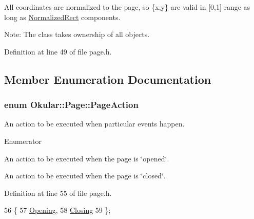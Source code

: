 All coordinates are normalized to the page, so \{x,y\} are valid in \mbox{[}0,1\mbox{]} range as long as \hyperlink{classOkular_1_1NormalizedRect}{Normalized\+Rect} components.

Note\+: The class takes ownership of all objects. 

Definition at line 49 of file page.\+h.



\subsection{Member Enumeration Documentation}
\hypertarget{classOkular_1_1Page_a6a8e241cdb604d5c90d5f80b169788f7}{
\subsubsection[{Page\+Action}]{\setlength{\rightskip}{0pt plus 5cm}enum {\bf Okular\+::\+Page\+::\+Page\+Action}}}\label{classOkular_1_1Page_a6a8e241cdb604d5c90d5f80b169788f7}
An action to be executed when particular events happen. \begin{Desc}
\item[Enumerator]\par
\begin{description}
\item[{\em 
\hypertarget{classOkular_1_1Page_a6a8e241cdb604d5c90d5f80b169788f7adbcb6b79c0b2118ed23a0d1c89391f87}{Opening}\label{classOkular_1_1Page_a6a8e241cdb604d5c90d5f80b169788f7adbcb6b79c0b2118ed23a0d1c89391f87}
}]An action to be executed when the page is \char`\"{}opened\char`\"{}. \item[{\em 
\hypertarget{classOkular_1_1Page_a6a8e241cdb604d5c90d5f80b169788f7ae9b42d3ddb97cc7f889104c73c686f80}{Closing}\label{classOkular_1_1Page_a6a8e241cdb604d5c90d5f80b169788f7ae9b42d3ddb97cc7f889104c73c686f80}
}]An action to be executed when the page is \char`\"{}closed\char`\"{}. \end{description}
\end{Desc}


Definition at line 55 of file page.\+h.


\begin{DoxyCode}
56         \{
57             \hyperlink{classOkular_1_1Page_a6a8e241cdb604d5c90d5f80b169788f7adbcb6b79c0b2118ed23a0d1c89391f87}{Opening},       
58             \hyperlink{classOkular_1_1Page_a6a8e241cdb604d5c90d5f80b169788f7ae9b42d3ddb97cc7f889104c73c686f80}{Closing}        
59         \};
\end{DoxyCode}


